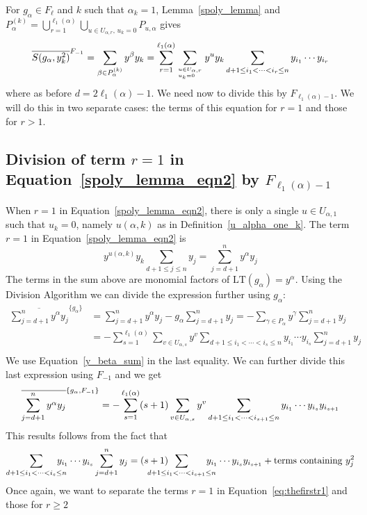 \documentclass[12pt,reqno]{amsart}
\theoremstyle{plain}
\theoremstyle{definition}
\begin{document}
For $g_\alpha\in F_\ell$ and $k$ such that
$\alpha_k = 1$, Lemma~\ref{spoly_lemma} and $P_\alpha^{(k)} = \bigcup_{r = 1}^{\ell_1(\alpha)} \bigcup_{u \in U_{\alpha,r},\,u_k=0 } P_{u,\alpha}$ gives
\begin{equation}
 \label{spoly_lemma_eqn2}
	\overline{S(g_\alpha, y_k^2)}^{F_{-1}} = \sum_{\beta \in P_\alpha^{(k)}} y^\beta y_k  = \sum_{r=1}^{\ell_1(\alpha)}\sum_{u \in U_{\alpha,r}\atop u_k=0 \hfill} y^{u}y_k \sum_{d+1 \leq i_1 < \cdots < i_r \leq n} y_{i_1} \cdots y_{i_{r}}  
\end{equation} 
where as before $d=2\ell_1(\alpha)-1$. We need now to divide this by $F_{\ell_1(\alpha)-1}$. We will do this in two separate cases: the terms of this equation for $r=1$ and those for $r>1$.


\subsection{Division of term $r=1$ in Equation~\eqref{spoly_lemma_eqn2} by $F_{\ell_1(\alpha)-1}$}  \label{beta_prime_redu} 
When $r=1$ in Equation~\eqref{spoly_lemma_eqn2}, there is only a single $u\in U_{\alpha,1}$ such that $u_k=0$, namely $u(\alpha,k)$ as in Definition~\ref{u_alpha_one_k}.
The term $r=1$ in Equation~\eqref{spoly_lemma_eqn2} is 
$$
	 y^{u(\alpha,k)}y_k \sum_{d+1 \leq j \leq n}  y_{j}  = \sum_{j=d+1}^n y^\alpha y_j 
$$
The terms in the sum above are monomial factors of $\text{LT}(g_\alpha) = y^\alpha$.  Using the Division Algorithm we can divide the expression further using $ g_\alpha$:
    \begin{align*}
    \overline{ \sum_{j=d+1}^n y^\alpha y_j }^{\{g_\alpha\}} &=  \sum_{j=d+1}^n y^\alpha y_j - g_\alpha \sum_{j=d+1}^n y_j  
    =  -\sum_{\gamma \in P_\alpha}y^\gamma \sum_{j=d+1}^n y_j \\ 
    & = - \sum_{s=1}^{\ell_1(\alpha)} \sum_{v \in U_{\alpha,s}} y^v \sum_{d+1 \leq i_1 < \cdots < i_s \leq n}y_{i_1} \cdots y_{i_s} \sum_{j=d+1}^n y_j\\
\end{align*}
We use Equation~\eqref{y_beta_sum} in the last equality. We can further divide this last expression using $F_{-1}$ and we get
\begin{equation}\label{eq:thefirstr1}
    \overline{ \sum_{j=d+1}^n y^\alpha y_j }^{\{g_\alpha,F_{-1}\}} 
    = - \sum_{s=1}^{\ell_1(\alpha)} (s+1) \sum_{v \in U_{\alpha,s}} y^v \sum_{d+1 \leq i_1 < \cdots < i_{s+1} \leq n}y_{i_1} \cdots y_{i_s} y_{i_{s+1}} \\
\end{equation}
This results follows from the fact that 
\begin{align*}
   \sum_{d+1 \leq i_1 < \cdots < i_s \leq n} \hskip-12pt y_{i_1} \cdots y_{i_s} \sum_{j=d+1}^n y_j = (s+1)\hskip-24pt \sum_{d+1 \leq i_1 < \cdots < i_{s+1} \leq n} \hskip-12pt y_{i_1} \cdots y_{i_s} y_{i_{s+1}} + \text{terms containing $y_j^2$}
\end{align*}
Once again, we want to separate the terms $r =1$ in Equation~\eqref{eq:thefirstr1} and those for $r \geq 2$
\end{document}
